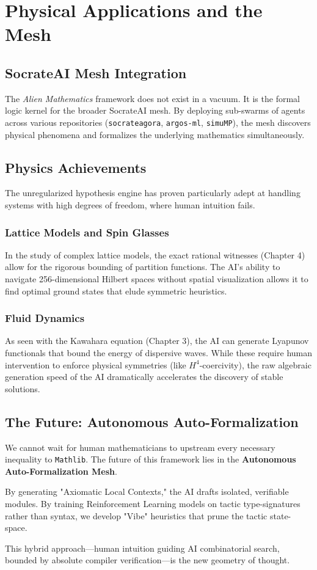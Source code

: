 \chapter{Physical Applications and the Mesh}

\section{SocrateAI Mesh Integration}

The \textit{Alien Mathematics} framework does not exist in a vacuum. It is the formal logic kernel for the broader SocrateAI mesh. By deploying sub-swarms of agents across various repositories (\texttt{socrateagora}, \texttt{argos-ml}, \texttt{simuMP}), the mesh discovers physical phenomena and formalizes the underlying mathematics simultaneously.

\section{Physics Achievements}

The unregularized hypothesis engine has proven particularly adept at handling systems with high degrees of freedom, where human intuition fails.

\subsection{Lattice Models and Spin Glasses}
In the study of complex lattice models, the exact rational witnesses (Chapter 4) allow for the rigorous bounding of partition functions. The AI's ability to navigate 256-dimensional Hilbert spaces without spatial visualization allows it to find optimal ground states that elude symmetric heuristics.

\subsection{Fluid Dynamics}
As seen with the Kawahara equation (Chapter 3), the AI can generate Lyapunov functionals that bound the energy of dispersive waves. While these require human intervention to enforce physical symmetries (like $H^4$-coercivity), the raw algebraic generation speed of the AI dramatically accelerates the discovery of stable solutions.

\section{The Future: Autonomous Auto-Formalization}

We cannot wait for human mathematicians to upstream every necessary inequality to \texttt{Mathlib}. The future of this framework lies in the \textbf{Autonomous Auto-Formalization Mesh}. 

By generating "Axiomatic Local Contexts," the AI drafts isolated, verifiable modules. By training Reinforcement Learning models on tactic type-signatures rather than syntax, we develop "Vibe" heuristics that prune the tactic state-space. 

This hybrid approach---human intuition guiding AI combinatorial search, bounded by absolute compiler verification---is the new geometry of thought.
